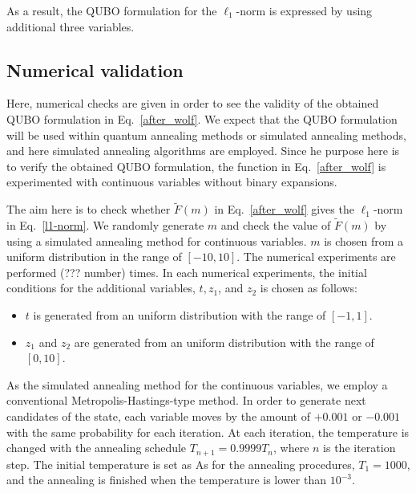 \documentclass[fp,twocolumn]{jpsj3}
\begin{document}
As a result, the QUBO formulation for the $\ell_{1}$-norm is expressed by using additional three variables.

\subsection{Numerical validation}


Here, numerical checks are given in order to see the validity of the obtained QUBO formulation in Eq.~\eqref{after_wolf}. We expect that the QUBO formulation will be used within quantum annealing methods or simulated annealing methods, and here simulated annealing algorithms are employed.
Since he purpose here is to verify the obtained QUBO formulation, the function in Eq.~\eqref{after_wolf} is experimented with continuous variables without binary expansions. 


The aim here is to check whether $\widetilde{F}(m)$ in Eq.~\eqref{after_wolf} gives the $\ell_{1}$-norm in Eq.~\eqref{l1-norm}. 
We randomly generate $m$ and check the value of $\widetilde{F}(m)$ by using a simulated annealing method for continuous variables. $m$ is chosen from a uniform distribution in the range of $[-10,10]$. 
The numerical experiments are performed (??? number) times.
In each numerical experiments, the initial conditions for the additional variables, $t, z_{1}$, and $z_{2}$ is chosen as follows:
\begin{itemize}
\item $t$ is generated from an uniform distribution with the range of $[-1,1]$.
\item $z_{1}$ and $z_{2}$ are generated from an uniform distribution with the range of $[0,10]$.
\end{itemize}



As the simulated annealing method for the continuous variables, we employ a conventional Metropolis-Hastings-type method.
In order to generate next candidates of the state, each variable moves by the amount of $+0.001$ or $-0.001$ with the same probability for each iteration.
At each iteration, the temperature is changed with the annealing schedule $T_{n+1}=0.9999T_{n}$, where $n$ is the iteration step.
The initial temperature is set as 
As for the annealing procedures, $T_{1}=1000$, and the annealing is finished when the temperature is lower than  $10^{-3}$.
\end{document}
